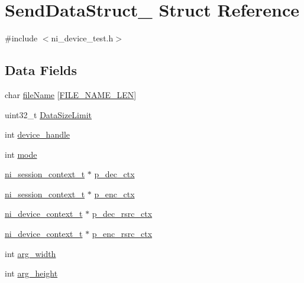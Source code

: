 \hypertarget{struct_send_data_struct__}{}\section{Send\+Data\+Struct\+\_\+ Struct Reference}
\label{struct_send_data_struct__}


{\ttfamily \#include $<$ni\+\_\+device\+\_\+test.\+h$>$}

\subsection*{Data Fields}
\begin{DoxyCompactItemize}
\item 
char \mbox{\hyperlink{struct_send_data_struct___a1d89f9668c6a633415048f1557a27122}{file\+Name}} \mbox{[}\mbox{\hyperlink{ni__device__test_8h_afddfc0468a0fb0d80c116b5e16b9be17}{F\+I\+L\+E\+\_\+\+N\+A\+M\+E\+\_\+\+L\+EN}}\mbox{]}
\item 
uint32\+\_\+t \mbox{\hyperlink{struct_send_data_struct___a4aa53b9be31c92ae0c808987161f96d3}{Data\+Size\+Limit}}
\item 
int \mbox{\hyperlink{struct_send_data_struct___a9f7ec948aaf8e58f5662ee0a5d9072c2}{device\+\_\+handle}}
\item 
int \mbox{\hyperlink{struct_send_data_struct___a1ea5d0cb93f22f7d0fdf804bd68c3326}{mode}}
\item 
\mbox{\hyperlink{ni__device__api_8h_a9fdb59b68eed0a6ee64b44827cbb729d}{ni\+\_\+session\+\_\+context\+\_\+t}} $\ast$ \mbox{\hyperlink{struct_send_data_struct___aa876a317f0d32be2ff820fffcb6994a1}{p\+\_\+dec\+\_\+ctx}}
\item 
\mbox{\hyperlink{ni__device__api_8h_a9fdb59b68eed0a6ee64b44827cbb729d}{ni\+\_\+session\+\_\+context\+\_\+t}} $\ast$ \mbox{\hyperlink{struct_send_data_struct___a0dcef0baa36ca3470b4c561444d1b68c}{p\+\_\+enc\+\_\+ctx}}
\item 
\mbox{\hyperlink{ni__rsrc__api_8h_a880a361e6e867b45d102656e813a046f}{ni\+\_\+device\+\_\+context\+\_\+t}} $\ast$ \mbox{\hyperlink{struct_send_data_struct___aa1910cac8a0d830cdefe42be0f679340}{p\+\_\+dec\+\_\+rsrc\+\_\+ctx}}
\item 
\mbox{\hyperlink{ni__rsrc__api_8h_a880a361e6e867b45d102656e813a046f}{ni\+\_\+device\+\_\+context\+\_\+t}} $\ast$ \mbox{\hyperlink{struct_send_data_struct___a09d92e4609148acb4d096280e071c557}{p\+\_\+enc\+\_\+rsrc\+\_\+ctx}}
\item 
int \mbox{\hyperlink{struct_send_data_struct___aecc7f5c68a0c2772c369ca1e574a5af0}{arg\+\_\+width}}
\item 
int \mbox{\hyperlink{struct_send_data_struct___ae91e67d3ca1ac1094294c59a78135739}{arg\+\_\+height}}
\end{DoxyCompactItemize}


